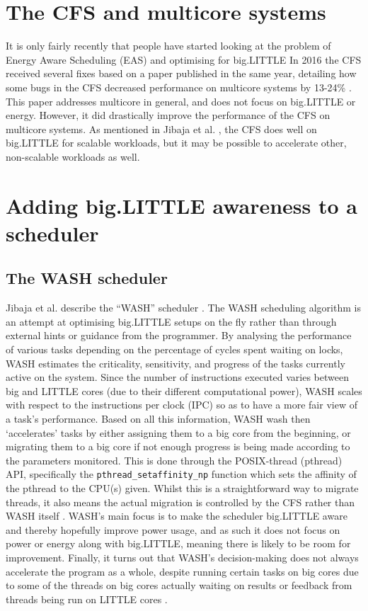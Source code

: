 \section{The CFS and multicore systems}
It is only fairly recently that people have started looking at the problem of
Energy Aware Scheduling (EAS) and optimising for big.LITTLE  In 2016 the CFS
received several fixes based on a paper published in the same year, detailing
how some bugs in the CFS decreased performance on multicore systems by 13-24\%
\cite{lozi_linux_2016}. This paper addresses multicore in general, and does not
focus on big.LITTLE or energy. However, it did drastically improve the
performance of the CFS on multicore systems. As mentioned in Jibaja et al.
\cite{jibaja_portable_2016}, the CFS does well on big.LITTLE for scalable
workloads, but it may be possible to accelerate other, non-scalable workloads as
well.

\section{Adding big.LITTLE awareness to a scheduler}
    \subsection{The WASH scheduler}
    Jibaja et al. describe the ``WASH'' scheduler \cite{jibaja_portable_2016}. 
    The WASH scheduling algorithm is an attempt at optimising big.LITTLE setups 
    on the fly rather than through external hints or guidance from the 
    programmer. By analysing the performance of various tasks depending on the 
    percentage of cycles spent waiting on locks, WASH estimates the 
    criticality, sensitivity, and progress of the tasks currently active on the 
    system. Since the number of instructions executed varies between big and 
    LITTLE cores (due to their different computational power), WASH scales with 
    respect to the instructions per clock (IPC) so as to have a more fair view 
    of a task's performance. Based on all this information, WASH wash then 
    `accelerates' tasks by either assigning them to a big core from the 
    beginning, or migrating them to a big core if not enough progress is being 
    made according to the parameters monitored. This is done through the 
    POSIX-thread (pthread) API, specifically the 
    \texttt{pthread\_setaffinity\_np} function which sets the affinity of the 
    pthread to the CPU(s) given. Whilst this is a straightforward way to migrate
    threads, it also means the actual migration is controlled by the CFS rather
    than WASH itself \cite{yu_colab_2020}. WASH's main focus is to make the
    scheduler big.LITTLE aware and thereby hopefully improve power usage, and as
    such it does not focus on power or energy along with big.LITTLE, meaning 
    there is likely to be room for improvement. Finally, it turns out that 
    WASH's decision-making does not always accelerate the program as a whole, 
    despite running certain tasks on big cores due to some of the threads on big
    cores actually waiting on results or feedback from threads being run on 
    LITTLE cores \cite{yu_colab_2020}.
    
